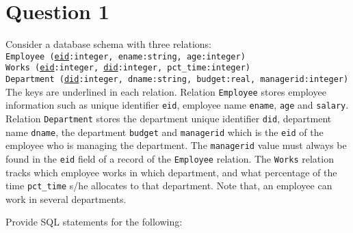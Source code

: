 
\section*{Question 1}

Consider a database schema with three relations:\\

\texttt{Employee (\underline{eid}:integer, ename:string, age:integer)}\\
\texttt{Works (\underline{eid}:integer, \underline{did}:integer, pct\_time:integer)}\\
\texttt{Department (\underline{did}:integer, dname:string, budget:real, managerid:integer)}\\

The keys are underlined in each relation. Relation \texttt{Employee} stores employee information such as unique identifier \texttt{eid}, employee name \texttt{ename}, \texttt{age} and \texttt{salary}. Relation \texttt{Department} stores the department unique identifier \texttt{did}, department name \texttt{dname}, the department \texttt{budget} and \texttt{managerid} which is the \texttt{eid} of the employee who is managing the department. The \texttt{managerid} value must always be found in the \texttt{eid} field of a record of the \texttt{Employee} relation. The \texttt{Works} relation tracks which employee works in which department, and what percentage of the time \texttt{pct\_time} s/he allocates to that department. Note that, an employee can work in several departments.

Provide SQL statements for the following:

